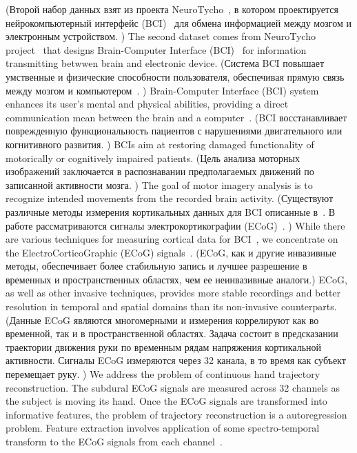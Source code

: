 \documentclass[12pt,twoside]{article}
\begin{document}
(Второй набор данных взят из проекта NeuroTycho~\cite{neurotycho}, в котором проектируется нейрокомпьютерный интерфейс (BCI)~\cite{millan2010combining,mason2007comprehensive} для обмена информацией между мозгом и электронным устройством. )
The second dataset comes from NeuroTycho project~\cite{neurotycho} that designs Brain-Computer Interface (BCI)~\cite{millan2010combining,mason2007comprehensive} for information transmitting betwwen brain and electronic device.
(Система BCI повышает умственные и физические способности пользователя, обеспечивая прямую связь между мозгом и компьютером~\cite{millan2004brain}. )
Brain-Computer Interface (BCI) system enhances its user’s mental and physical abilities, providing a direct communication mean between the brain and a computer~\cite{millan2004brain}. 
(BCI восстанавливает поврежденную функциональность пациентов с нарушениями двигательного или когнитивного развития. )
BCIs aim at restoring damaged functionality of motorically or cognitively impaired patients.
(Цель анализа моторных изображений заключается в распознавании предполагаемых движений по записанной активности мозга. )
The goal of motor imagery analysis is to recognize intended movements from the recorded brain activity. 
(Существуют различные методы измерения кортикальных данных для BCI описанные в~\cite{nicolas2012brain,amiri2013review}. 
В работе рассматриваются сигналы электрокортикографии (ECoG)~\cite{eliseyev2016penalized}. )
While there are various techniques for measuring cortical data for BCI~\cite{nicolas2012brain,amiri2013review}, we concentrate on the ElectroCorticoGraphic (ECoG) signals~\cite{eliseyev2016penalized}. 
(ECoG, как и другие инвазивные методы, обеспечивает более стабильную запись и лучшее разрешение в временных и пространственных областях, чем ее неинвазивные аналоги.)
ECoG, as well as other invasive techniques, provides more stable recordings and better resolution in temporal and spatial domains than its non-invasive counterparts.
(Данные ECoG являются многомерными и измерения коррелируют как во временной, так и в пространственной областях.
Задача состоит в предсказании траектории движения руки по временным рядам напряжения кортикальной активности. 
Сигналы ECoG измеряются через 32 канала, в то время как субъект перемещает руку. )
We address the problem of continuous hand trajectory reconstruction. 
The subdural ECoG signals are measured across 32 channels as the subject is moving its hand.
Once the ECoG signals are transformed into informative features, the problem of trajectory reconstruction is a autoregression problem. 
Feature extraction involves application of some spectro-temporal transform to the ECoG signals from each channel~\cite{gasanov2017pls}.
\end{document}
